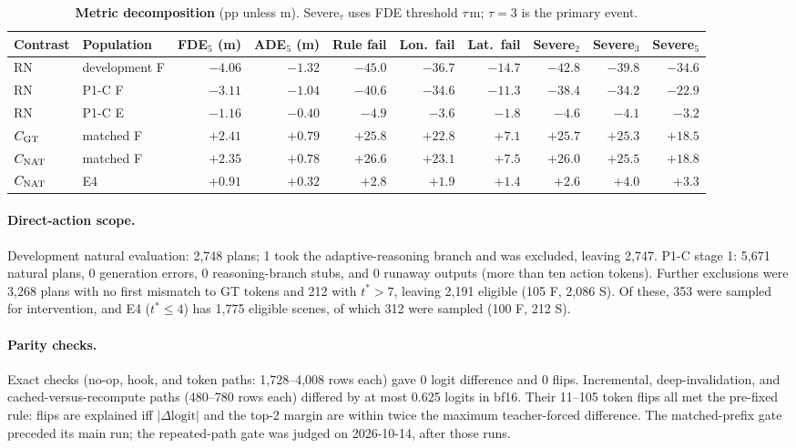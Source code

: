 \begin{table}[h]
\centering\small
\caption{\textbf{Metric decomposition} (pp unless m). Severe$_\tau$ uses FDE threshold $\tau$\,m; $\tau=3$ is the primary event.}
\label{tab:decomp}
\setlength{\tabcolsep}{3.5pt}
\begin{tabular}{@{}llrrrrrrrr@{}}\toprule
Contrast & Population & FDE$_5$ (m) & ADE$_5$ (m) & Rule fail & Lon.\ fail & Lat.\ fail & Severe$_2$ & Severe$_3$ & Severe$_5$\\\midrule
RN & development F & $-4.06$ & $-1.32$ & $-45.0$ & $-36.7$ & $-14.7$ & $-42.8$ & $-39.8$ & $-34.6$\\
RN & P1-C F & $-3.11$ & $-1.04$ & $-40.6$ & $-34.6$ & $-11.3$ & $-38.4$ & $-34.2$ & $-22.9$\\
RN & P1-C E & $-1.16$ & $-0.40$ & $-4.9$ & $-3.6$ & $-1.8$ & $-4.6$ & $-4.1$ & $-3.2$\\
$C_{\mathrm{GT}}$ & matched F & $+2.41$ & $+0.79$ & $+25.8$ & $+22.8$ & $+7.1$ & $+25.7$ & $+25.3$ & $+18.5$\\
$C_{\mathrm{NAT}}$ & matched F & $+2.35$ & $+0.78$ & $+26.6$ & $+23.1$ & $+7.5$ & $+26.0$ & $+25.5$ & $+18.8$\\
$C_{\mathrm{NAT}}$ & E4 & $+0.91$ & $+0.32$ & $+2.8$ & $+1.9$ & $+1.4$ & $+2.6$ & $+4.0$ & $+3.3$\\\bottomrule
\end{tabular}
\end{table}

\paragraph{Direct-action scope.} Development natural evaluation: 2,748 plans; 1 took the adaptive-reasoning branch and was excluded, leaving 2,747. P1-C stage 1: 5,671 natural plans, 0 generation errors, 0 reasoning-branch stubs, and 0 runaway outputs (more than ten action tokens). Further exclusions were 3,268 plans with no first mismatch to GT tokens and 212 with $t^*>7$, leaving 2,191 eligible (105 F, 2,086 S). Of these, 353 were sampled for intervention, and E4 ($t^*\leq4$) has 1,775 eligible scenes, of which 312 were sampled (100 F, 212 S).

\paragraph{Parity checks.} Exact checks (no-op, hook, and token paths: 1,728--4,008 rows each) gave 0 logit difference and 0 flips. Incremental, deep-invalidation, and cached-versus-recompute paths (480--780 rows each) differed by at most 0.625 logits in bf16. Their 11--105 token flips all met the pre-fixed rule: flips are explained iff $|\Delta\text{logit}|$ and the top-2 margin are within twice the maximum teacher-forced difference. The matched-prefix gate preceded its main run; the repeated-path gate was judged on 2026-10-14, after those runs.

